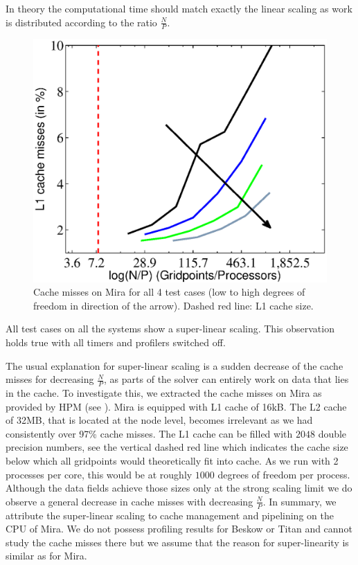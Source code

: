 \documentclass{sig-alternate}
\begin{document}
In theory the computational time should match exactly the linear scaling
as work is distributed according to the ratio $\frac{N}{P}$. 

\begin{figure}
  \centering
  \includegraphics[width=\linewidth]{./figures/cachearrow.eps}
  \caption{Cache misses on Mira for all 4 test cases (low to high degrees of freedom in direction of the arrow). Dashed red line: L1 cache size.}
   \label{fig:cachemisses}
\end{figure}

All test cases on all the systems show a super-linear scaling. This
observation holds true with all timers and profilers switched off.

The usual explanation for super-linear scaling is a sudden decrease of the cache
misses for decreasing $\frac{N}{P}$, as parts of the solver can entirely work on data that lies in the cache. 
To investigate this, we extracted the cache misses on Mira as provided by HPM (see
). Mira is equipped with L1 cache of 16kB. The L2 cache
of 32MB, that is located at the node level, becomes irrelevant as we had consistently
over 97\% cache misses. The L1 cache can be filled with $2048$ double precision
numbers, see
 the vertical dashed red line which indicates the cache 
size below which all gridpoints would theoretically fit into cache. As we run with 2 processes per core, this would be at roughly $1000$
degrees of freedom per process. Although the data fields achieve those sizes only at the strong scaling
limit we do observe a general decrease in cache misses with decreasing
$\frac{N}{P}$. In summary, we attribute the super-linear scaling to cache
management and pipelining on the CPU of Mira. We do not possess profiling results 
for Beskow or Titan and cannot study the cache misses there but we assume that the 
reason for super-linearity is similar as for Mira.
\end{document}
